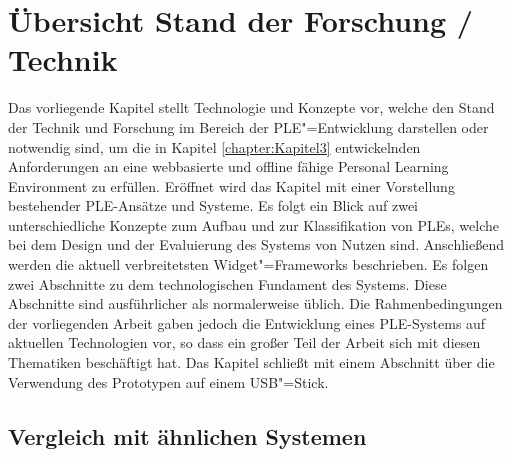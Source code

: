 \chapter{Übersicht Stand der Forschung / Technik}\label{chapter:Kapitel4}

Das vorliegende Kapitel stellt Technologie und Konzepte vor, welche den Stand der Technik und Forschung im Bereich der PLE"=Entwicklung darstellen oder notwendig sind, um die in Kapitel \ref{chapter:Kapitel3} entwickelnden Anforderungen an eine webbasierte und offline fähige Personal Learning Environment zu erfüllen. Eröffnet wird das Kapitel mit einer Vorstellung bestehender PLE-Ansätze und Systeme. Es folgt ein Blick auf zwei unterschiedliche Konzepte zum Aufbau und zur Klassifikation von PLEs, welche bei dem Design und der Evaluierung des Systems von Nutzen sind. Anschließend werden die aktuell verbreitetsten Widget"=Frameworks beschrieben. Es folgen zwei Abschnitte zu dem technologischen Fundament des Systems. Diese Abschnitte sind ausführlicher als normalerweise üblich. Die Rahmenbedingungen der vorliegenden Arbeit gaben jedoch die Entwicklung eines PLE-Systems auf aktuellen Technologien vor, so dass ein großer Teil der Arbeit sich mit diesen Thematiken beschäftigt hat. Das Kapitel schließt mit einem Abschnitt über die Verwendung des Prototypen auf einem USB"=Stick. 

\section{Vergleich mit ähnlichen Systemen}\label{section:aehnliche_systeme}


